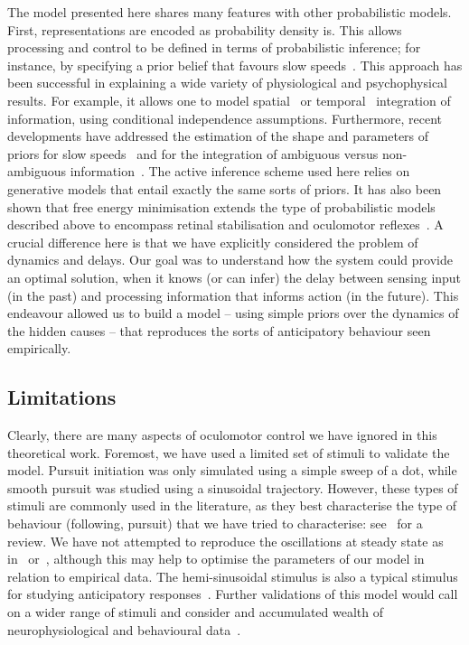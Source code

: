 \documentclass[a4paper]{article} %
\begin{document}
The model presented here shares many features with other probabilistic
models. First, representations are encoded as probability density is.
This allows processing and control to be defined in terms of
probabilistic inference; for instance, by specifying a prior belief that
favours slow speeds~\citep{Weiss02}. This approach has been
successful in explaining a wide variety of physiological and
psychophysical results. For example, it allows one to model spatial~\citep{Perrinet07neurocomp} or temporal~\citep{Montagnini07}
integration of information, using conditional independence assumptions.
Furthermore, recent developments have addressed the estimation of the
shape and parameters of priors for slow speeds~\citep{Stocker06} and for the integration of ambiguous versus non-ambiguous
information~\citep{Bogadhi11a}. The active inference scheme used
here relies on generative models that entail exactly the same sorts of
priors. It has also been shown that free energy minimisation extends the
type of probabilistic models described above to encompass retinal
stabilisation and oculomotor reflexes~\citep{Friston10a}. A crucial
difference here is that we have explicitly considered the problem of
dynamics and delays. Our goal was to understand how the system could
provide an optimal solution, when it knows (or can infer) the delay
between sensing input (in the past) and processing information that
informs action (in the future). This endeavour allowed us to build a
model -- using simple priors over the dynamics of the hidden causes --
that reproduces the sorts of anticipatory behaviour seen empirically.

\subsection{Limitations}

Clearly, there are many aspects of oculomotor control we have ignored in
this theoretical work. Foremost, we have used a limited set of stimuli
to validate the model. Pursuit initiation was only simulated using a
simple sweep of a dot, while smooth pursuit was studied using a
sinusoidal trajectory. However, these types of stimuli are commonly used
in the literature, as they best characterise the type of behaviour
(following, pursuit) that we have tried to characterise: see~\citep{Barnes08} for a review. We have not attempted to reproduce the oscillations
at steady state as in~\citep{Robinson86} or~\citep{Goldreich92},
although this may help to optimise the parameters of our model in
relation to empirical data. The hemi-sinusoidal stimulus is also a
typical stimulus for studying anticipatory responses~\citep{Avila06,Barnes00}. Further validations of this model would call on a
wider range of stimuli and consider and accumulated wealth of
neurophysiological and behavioural data~\citep{Tlapale10benchmark}.
\end{document}
